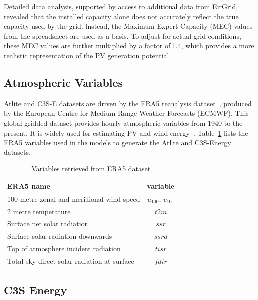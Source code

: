 \documentclass[a4paper, 11pt]{article}
\begin{document}
Detailed data analysis, supported by access to additional data from EirGrid, revealed that the installed capacity alone does not accurately reflect the true capacity used by the grid. Instead, the Maximum Export Capacity (MEC) values from the spreadsheet are used as a basis. To adjust for actual grid conditions, these MEC values are further multiplied by a factor of 1.4, which provides a more realistic representation of the PV generation potential.

\subsection{Atmospheric Variables}
\label{sec:era5}
 
Atlite and C3S-E datasets are driven by the ERA5 reanalysis dataset~\cite{hersbach2020era5}, produced by the European Centre for Medium-Range Weather Forecasts (ECMWF). This global gridded dataset provides hourly atmospheric variables from 1940 to the present. It is widely used for estimating PV and wind energy~\cite{mockert2023drought, dubus2023energy, brown2021drought, otero2022drought}. Table~\ref{tab:var_name} lists the ERA5 variables used in the models to generate the Atlite and C3S-Energy datasets.

\begin{table}[h!]
	\centering
	\begin{tabular}{|l|c|}
		\hline
		{\textbf{ERA5 name}}      & \textbf{variable} \\ \hline
		100 metre zonal and meridional wind speed   & $u_{100}$, $v_{100}$ \\
		2 metre temperature                         & $t2m$ \\
		Surface net solar radiation                 & $ssr$ \\
		Surface solar radiation downwards           & $ssrd$  \\
		Top of atmosphere incident radiation        & $tisr$  \\
		Total sky direct solar radiation at surface & $fdir$  \\ \hline
	\end{tabular}
	\caption{Variables retrieved from ERA5 dataset}
	\label{tab:var_name}
\end{table}

\subsection{C3S Energy}
\label{sec:c3se}
\end{document}
